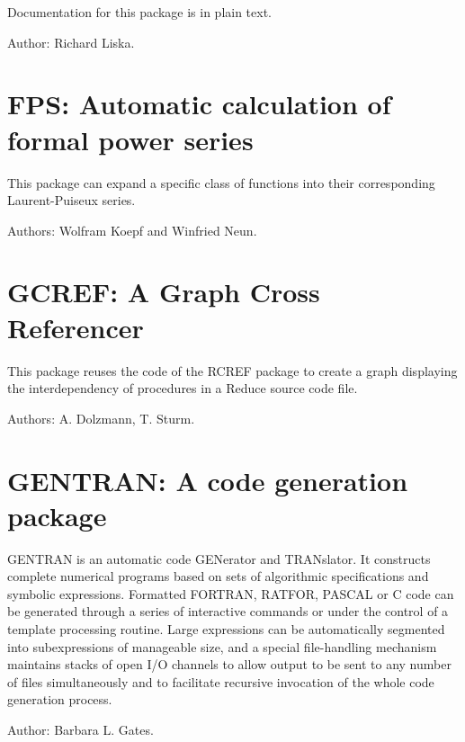 Documentation for this package is in plain text.

Author: Richard Liska.


\newpage

\section{FPS: Automatic calculation of formal power series} 

This package can expand a specific class of functions into their
corresponding Laurent-Puiseux series.

Authors: Wolfram Koepf and Winfried Neun.


\newpage


\section{GCREF: A Graph Cross Referencer}
\label{GCREF}

This package reuses the code of the RCREF package to create a graph displaying
the interdependency of procedures in a Reduce source code file. 

Authors: A. Dolzmann, T. Sturm.


\newpage

\section{GENTRAN: A code generation package} 
\label{GENTRAN}

GENTRAN is an automatic code GENerator and TRANslator. It constructs
complete numerical programs based on sets of algorithmic specifications
and symbolic expressions. Formatted FORTRAN, RATFOR, PASCAL or C code can be
generated through a series of interactive commands or under the control of
a template processing routine. Large expressions can be automatically
segmented into subexpressions of manageable size, and a special
file-handling mechanism maintains stacks of open I/O channels to allow
output to be sent to any number of files simultaneously and to facilitate
recursive invocation of the whole code generation process.

Author: Barbara L. Gates.


\newpage

